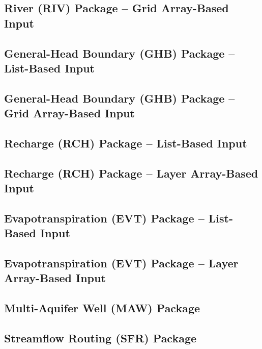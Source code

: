 \newpage
\subsection{River (RIV) Package -- Grid Array-Based Input}


\newpage
\subsection{General-Head Boundary (GHB) Package -- List-Based Input}


\newpage
\subsection{General-Head Boundary (GHB) Package -- Grid Array-Based Input}


\newpage
\subsection{Recharge (RCH) Package -- List-Based Input}


\newpage
\subsection{Recharge (RCH) Package -- Layer Array-Based Input}


\newpage
\subsection{Evapotranspiration (EVT) Package -- List-Based Input}


\newpage
\subsection{Evapotranspiration (EVT) Package -- Layer Array-Based Input}


\newpage
\subsection{Multi-Aquifer Well (MAW) Package}


\newpage
\subsection{Streamflow Routing (SFR) Package}


\newpage
